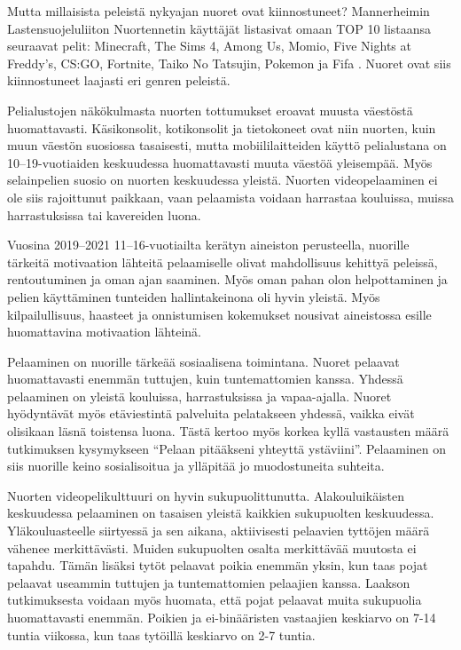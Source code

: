 \documentclass[utf8,bachelor]{gradu3}
\begin{document}
Mutta millaisista peleistä nykyajan nuoret ovat kiinnostuneet? Mannerheimin Lastensuojeluliiton Nuortennetin käyttäjät listasivat omaan TOP 10 listaansa seuraavat pelit: Minecraft, The Sims 4, Among Us, Momio, Five Nights at Freddy’s, CS:GO, Fortnite, Taiko No Tatsujin, Pokemon ja Fifa \parencite{nuortennettiparas}. Nuoret ovat siis kiinnostuneet laajasti eri genren peleistä.  

Pelialustojen näkökulmasta nuorten tottumukset eroavat muusta väestöstä huomattavasti. Käsikonsolit, kotikonsolit ja tietokoneet ovat niin nuorten, kuin muun väestön suosiossa tasaisesti, mutta mobiililaitteiden käyttö pelialustana on 10–19-vuotiaiden keskuudessa huomattavasti muuta väestöä yleisempää. Myös selainpelien suosio on nuorten keskuudessa yleistä. Nuorten videopelaaminen ei ole siis rajoittunut paikkaan, vaan pelaamista voidaan harrastaa kouluissa, muissa harrastuksissa tai kavereiden luona. \parencite{koululaiskysely2022} 

Vuosina 2019–2021 11–16-vuotiailta kerätyn aineiston perusteella, nuorille tärkeitä motivaation lähteitä pelaamiselle olivat mahdollisuus kehittyä peleissä, rentoutuminen ja oman ajan saaminen. Myös oman pahan olon helpottaminen ja pelien käyttäminen tunteiden hallintakeinona oli hyvin yleistä. Myös kilpailullisuus, haasteet ja onnistumisen kokemukset nousivat aineistossa esille huomattavina motivaation lähteinä. \parencite{laakso2023lasten}  

Pelaaminen on nuorille tärkeää sosiaalisena toimintana. Nuoret pelaavat huomattavasti enemmän tuttujen, kuin tuntemattomien kanssa. Yhdessä pelaaminen on yleistä kouluissa, harrastuksissa ja vapaa-ajalla. Nuoret hyödyntävät myös etäviestintä palveluita pelatakseen yhdessä, vaikka eivät olisikaan läsnä toistensa luona. Tästä kertoo myös korkea kyllä vastausten määrä tutkimuksen kysymykseen “Pelaan pitääkseni yhteyttä ystäviini”. Pelaaminen on siis nuorille keino sosialisoitua ja ylläpitää jo muodostuneita suhteita. \parencite{laakso2023lasten} 

Nuorten videopelikulttuuri on hyvin sukupuolittunutta. Alakouluikäisten keskuudessa pelaaminen on tasaisen yleistä kaikkien sukupuolten keskuudessa. Yläkouluasteelle siirtyessä ja sen aikana, aktiivisesti pelaavien tyttöjen määrä vähenee merkittävästi. Muiden sukupuolten osalta merkittävää muutosta ei tapahdu. Tämän lisäksi tytöt pelaavat poikia enemmän yksin, kun taas pojat pelaavat useammin tuttujen ja tuntemattomien pelaajien kanssa. Laakson tutkimuksesta voidaan myös huomata, että pojat pelaavat muita sukupuolia huomattavasti enemmän.  Poikien ja ei-binääristen vastaajien keskiarvo on 7-14 tuntia viikossa, kun taas tytöillä keskiarvo on 2-7 tuntia. \parencite{laakso2023lasten} 
\end{document}
